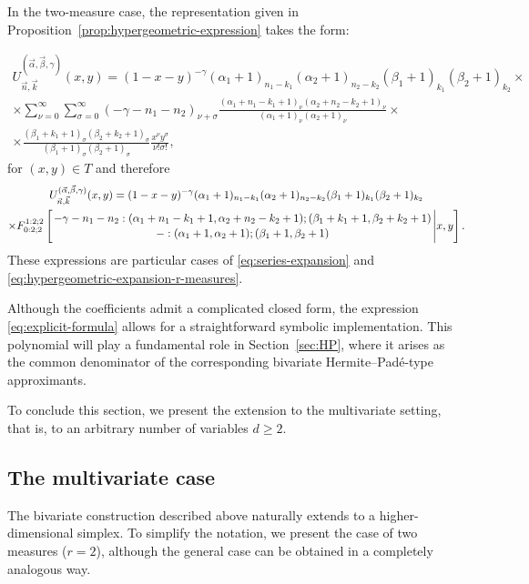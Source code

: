 \documentclass[11pt,reqno]{amsart}
\newcommand{\KF}[5]{F^{#1}_{#2}\left[{#3\atop #4}\Bigg\vert #5\right]}
\theoremstyle{definition}
\begin{document}
In the two-measure case, the representation given in Proposition~\ref{prop:hypergeometric-expression} takes the form:

\begin{multline*}
        U_{\vec n, \vec k}^{(\vec \alpha, \vec \beta, \gamma)}(x,y) =
        (1-x-y)^{-\gamma}(\alpha_1+1)_{n_1-k_1} (\alpha_2+1)_{n_2-k_2}(\beta_1+1)_{k_1}
        (\beta_2 +1)_{k_2}\times \\
        \times
        \sum_{\nu=0}^{\infty}  \sum_{\sigma=0}^{\infty} (-\gamma-n_1-n_2)_{\nu+\sigma}\frac{(\alpha_1+n_1-k_1+1)_\nu (\alpha_2+n_2-k_2+1)_\nu} {(\alpha_1+1)_\nu (\alpha_2+1)_\nu}\times \\
        \times \frac{(\beta_1+k_1+1)_\sigma (\beta_2+k_2+1)_\sigma} {(\beta_1+1)_\sigma (\beta_2+1)_\sigma} \frac{x^\nu y^\sigma}{\nu! \sigma!},
\end{multline*}
      for $(x,y)\in T$ and therefore
 \begin{multline}
        \label{eq:formula_hypergeometrica}
        U_{\vec n, \vec k}^{(\vec \alpha, \vec \beta, \gamma)}(x,y) =
        (1-x-y)^{-\gamma}(\alpha_1+1)_{n_1-k_1} (\alpha_2+1)_{n_2-k_2}(\beta_1+1)_{k_1}
        (\beta_2 +1)_{k_2} \\
        \times
        \KF{1:2;2}{0:2;2}{-\gamma-n_1-n_2:(\alpha_1+n_1-k_1+1,\alpha_2+n_2-k_2+1);(\beta_1+k_1+1,\beta_2+k_2+1)}{-:(\alpha_1+1,\alpha_2+1);(\beta_1+1,\beta_2+1)}{x,y}
        .
\end{multline}
These expressions are particular cases of \eqref{eq:series-expansion} and \eqref{eq:hypergeometric-expansion-r-measures}.


Although the coefficients admit a complicated closed form, the expression \eqref{eq:explicit-formula} allows for a straightforward symbolic implementation. This polynomial will play a fundamental role in Section~\ref{sec:HP}, where it arises as the common denominator of the corresponding bivariate Hermite--Padé-type approximants.

To conclude this section, we present the extension to the multivariate setting, that is, to an arbitrary number of variables $d\geq 2$.

\subsection{The multivariate case}\label{sec:more-than-2-vars}

The bivariate construction described above naturally extends to a higher-dimensional simplex. To simplify the notation, we present the case of two measures ($r=2$), although the general case can be obtained in a completely analogous way.
\end{document}
